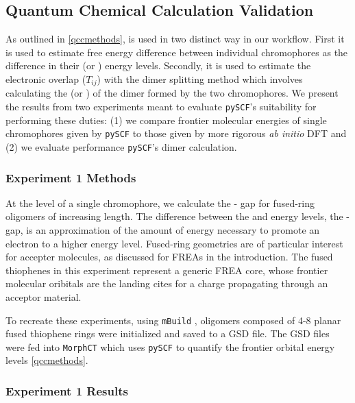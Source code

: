 \label{validation}

\subsection{Quantum Chemical Calculation Validation}

As outlined in \autoref{qccmethods},  is used in two distinct way in our workflow. 
First it is used to estimate free energy
difference between individual chromophores as the difference in their  (or ) energy levels.
Secondly, it is used to estimate the electronic overlap ($T_{ij}$) with the dimer splitting method which involves
calculating the  (or ) of the dimer formed by the two chromophores. We present the results from two
experiments meant to evaluate \texttt{pySCF}'s suitability for performing these duties:
(1) we compare frontier molecular energies of single chromophores given by \texttt{pySCF} to those
given by more rigorous \textit{ab initio} DFT and (2) we evaluate performance \texttt{pySCF}'s dimer calculation.

\subsubsection{Experiment 1 Methods}

At the level of a single chromophore, we calculate the - gap for fused-ring
oligomers of increasing length. 
The difference between the  and  energy levels, the - gap, is an approximation of the amount
of energy necessary to promote an electron to a higher energy level.  
Fused-ring geometries are of particular interest for accepter
molecules, as discussed for FREAs in the introduction. 
The fused thiophenes in this experiment represent a generic FREA core, whose frontier molecular oribitals are
the landing cites for a charge propagating through an acceptor material. 

To recreate these experiments, using \texttt{mBuild} \cite{Klein2016}, oligomers composed of 4-8 planar fused thiophene rings
were initialized and saved to a GSD file. The GSD files were fed into \texttt{MorphCT} which uses \texttt{pySCF} to quantify the
frontier orbital energy levels \autoref{qccmethods}.

\subsubsection{Experiment 1 Results}

